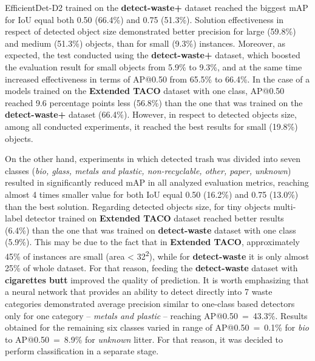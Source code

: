 \documentclass{article}
\begin{document}
\newpage
EfficientDet-D2 trained on the \textbf{detect-waste+} dataset reached the biggest mAP for IoU equal both 0.50 (66.4\%) and 0.75 (51.3\%). Solution effectiveness in respect of detected object size demonstrated better precision for large (59.8\%) and medium (51.3\%) objects, than for small (9.3\%) instances. Moreover, as expected, the test conducted using the \textbf{detect-waste+} dataset, which boosted the evaluation result for small objects from 5.9\% to 9.3\%, and at the same time increased effectiveness in terms of AP@0.50 from 65.5\% to 66.4\%. In the case of a models trained on the \textbf{Extended TACO} dataset with one class, AP@0.50 reached 9.6 percentage points less (56.8\%) than the one that was trained on the \textbf{detect-waste+} dataset (66.4\%). However, in respect to detected objects size, among all conducted experiments, it reached the best results for small (19.8\%) objects.

On the other hand, experiments in which detected trash was divided into seven classes (\textit{bio, glass, metals and plastic, non-recyclable, other, paper, unknown}) resulted in significantly reduced mAP in all analyzed evaluation metrics, reaching almost 4 times smaller value for both IoU equal 0.50 (16.2\%) and 0.75 (13.0\%) than the best solution. Regarding detected objects size, for tiny objects multi-label detector trained on \textbf{Extended TACO} dataset reached better results (6.4\%) than the one that was trained on \textbf{detect-waste} dataset with one class (5.9\%). This may be due to the fact that in \textbf{Extended TACO}, approximately 45\% of instances are small (area < 32\textsuperscript{2}), while for \textbf{detect-waste} it is only almost 25\% of whole dataset. For that reason, feeding the \textbf{detect-waste} dataset with \textbf{cigarettes butt} improved the quality of prediction. It is worth emphasizing that a neural network that provides an ability to detect directly into 7 waste categories demonstrated average precision similar to one-class based detectors only for one category -- \textit{metals and plastic} -- reaching \mbox{AP@0.50 = 43.3\%}. Results obtained for the remaining six classes varied in range of \mbox{AP@0.50 = 0.1\%} for \textit{bio} to \mbox{AP@0.50 = 8.9\%} for \textit{unknown} litter. For that reason, it was decided to perform classification in a separate stage.
 
\end{document}
